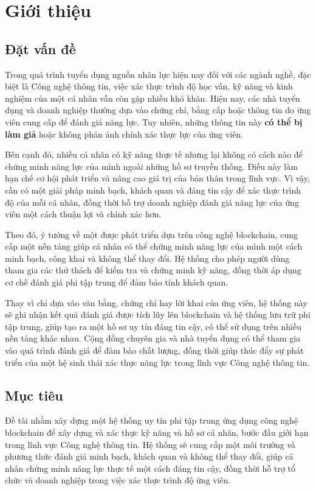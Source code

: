 \chapter{Giới thiệu}

\section{Đặt vấn đề}

Trong quá trình tuyển dụng nguồn nhân lực hiện nay đối với các ngành nghề, đặc biệt là Công nghệ thông tin, việc xác thực trình độ học vấn, kỹ năng và kinh nghiệm của một cá nhân vẫn còn gặp nhiều khó khăn.
Hiện nay, các nhà tuyển dụng và doanh nghiệp thường dựa vào chứng chỉ, bằng cấp hoặc thông tin do ứng viên cung cấp để đánh giá năng lực.
Tuy nhiên, những thông tin này \textbf{có thể bị làm giả} hoặc không phản ánh chính xác thực lực của ứng viên.

Bên cạnh đó, nhiều cá nhân có kỹ năng thực tế nhưng lại không có cách nào để chứng minh năng lực của mình ngoài những hồ sơ truyền thống. Điều này làm hạn chế cơ hội phát triển và nâng cao giá trị của bản thân trong lĩnh vực.
Vì vậy, cần có một giải pháp minh bạch, khách quan và đáng tin cậy để xác thực trình độ của mỗi cá nhân, đồng thời hỗ trợ doanh nghiệp đánh giá năng lực của ứng viên một cách thuận lợi và chính xác hơn.

Theo đó, ý tưởng về một \textbf{\thesisname} được phát triển dựa trên công nghệ blockchain, cung cấp một nền tảng giúp cá nhân có thể chứng minh năng lực của mình một cách minh bạch, công khai và không thể thay đổi.
Hệ thống cho phép người dùng tham gia các thử thách để kiểm tra và chứng minh kỹ năng, đồng thời áp dụng cơ chế đánh giá phi tập trung để đảm bảo tính khách quan.

Thay vì chỉ dựa vào văn bằng, chứng chỉ hay lời khai của ứng viên, hệ thống này sẽ ghi nhận kết quả đánh giá được tích lũy lên blockchain và hệ thống lưu trữ phi tập trung, giúp tạo ra một hồ sơ uy tín đáng tin cậy, có thể sử dụng trên nhiều nền tảng khác nhau.
Cộng đồng chuyên gia và nhà tuyển dụng có thể tham gia vào quá trình đánh giá để đảm bảo chất lượng, đồng thời giúp thúc đẩy sự phát triển của một hệ sinh thái xác thực năng lực trong lĩnh vực Công nghệ thông tin.

\section{Mục tiêu}

Đề tài nhằm xây dựng một hệ thống uy tín phi tập trung ứng dụng công nghệ blockchain để xây dựng và xác thực kỹ năng và hồ sơ cá nhân, bước đầu giới hạn trong lĩnh vực Công nghệ thông tin.
Hệ thống sẽ cung cấp một môi trường và phương thức đánh giá minh bạch, khách quan và không thể thay đổi, giúp cá nhân chứng minh năng lực thực tế một cách đáng tin cậy, đồng thời hỗ trợ tổ chức và doanh nghiệp trong việc xác thực trình độ ứng viên.

